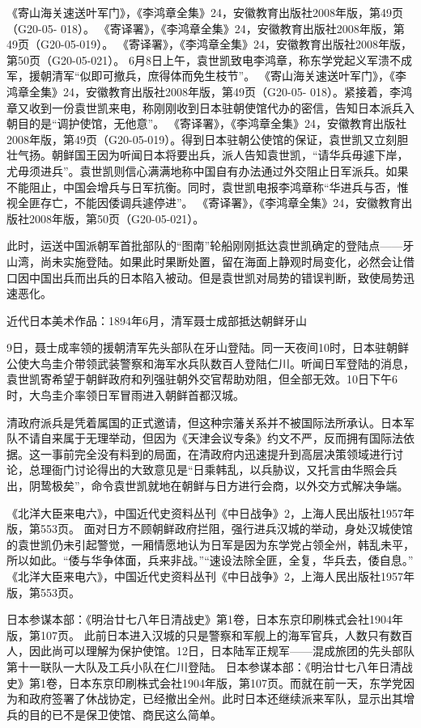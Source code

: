 \documentclass[12pt,UTF8]{ctexbook}
\begin{document}
《寄山海关速送叶军门》，《李鸿章全集》24，安徽教育出版社2008年版，第49页（G20-05- 018）。
《寄译署》，《李鸿章全集》24，安徽教育出版社2008年版，第49页（G20-05-019）。
《寄译署》，《李鸿章全集》24，安徽教育出版社2008年版，第50页（G20-05-021）。
6月8日上午，袁世凯致电李鸿章，称东学党起义军溃不成军，援朝清军“似即可撤兵，庶得体而免生枝节”。 《寄山海关速送叶军门》，《李鸿章全集》24，安徽教育出版社2008年版，第49页（G20-05- 018）。紧接着，李鸿章又收到一份袁世凯来电，称刚刚收到日本驻朝使馆代办的密信，告知日本派兵入朝目的是“调护使馆，无他意”。 《寄译署》，《李鸿章全集》24，安徽教育出版社2008年版，第49页（G20-05-019）。得到日本驻朝公使馆的保证，袁世凯又立刻胆壮气扬。朝鲜国王因为听闻日本将要出兵，派人告知袁世凯，“请华兵毋遽下岸，尤毋须进兵”。袁世凯则信心满满地称中国自有办法通过外交阻止日军派兵。如果不能阻止，中国会增兵与日军抗衡。同时，袁世凯电报李鸿章称“华进兵与否，惟视全匪存亡，不能因倭调兵遽停进”。 《寄译署》，《李鸿章全集》24，安徽教育出版社2008年版，第50页（G20-05-021）。

此时，运送中国派朝军首批部队的“图南”轮船刚刚抵达袁世凯确定的登陆点——牙山湾，尚未实施登陆。如果此时果断处置，留在海面上静观时局变化，必然会让借口因中国出兵而出兵的日本陷入被动。但是袁世凯对局势的错误判断，致使局势迅速恶化。


近代日本美术作品：1894年6月，清军聂士成部抵达朝鲜牙山

9日，聂士成率领的援朝清军先头部队在牙山登陆。同一天夜间10时，日本驻朝鲜公使大鸟圭介带领武装警察和海军水兵队数百人登陆仁川。听闻日军登陆的消息，袁世凯寄希望于朝鲜政府和列强驻朝外交官帮助劝阻，但全部无效。10日下午6时，大鸟圭介率领日军冒雨进入朝鲜首都汉城。

清政府派兵是凭着属国的正式邀请，但这种宗藩关系并不被国际法所承认。日本军队不请自来属于无理举动，但因为《天津会议专条》约文不严，反而拥有国际法依据。这一事前完全没有料到的局面，在清政府内迅速提升到高层决策领域进行讨论，总理衙门讨论得出的大致意见是“日乘韩乱，以兵胁议，又托言由华照会兵出，阴鸷极矣”，命令袁世凯就地在朝鲜与日方进行会商，以外交方式解决争端。

《北洋大臣来电六》，中国近代史资料丛刊《中日战争》2，上海人民出版社1957年版，第553页。
面对日方不顾朝鲜政府拦阻，强行进兵汉城的举动，身处汉城使馆的袁世凯仍未引起警觉，一厢情愿地认为日军是因为东学党占领全州，韩乱未平，所以如此。“倭与华争体面，兵来非战。”“速设法除全匪，全复，华兵去，倭自息。” 《北洋大臣来电六》，中国近代史资料丛刊《中日战争》2，上海人民出版社1957年版，第553页。

日本参谋本部：《明治廿七八年日清战史》第1卷，日本东京印刷株式会社1904年版，第107页。
此前日本进入汉城的只是警察和军舰上的海军官兵，人数只有数百人，因此尚可以理解为保护使馆。12日，日本陆军正规军——混成旅团的先头部队第十一联队一大队及工兵小队在仁川登陆。 日本参谋本部：《明治廿七八年日清战史》第1卷，日本东京印刷株式会社1904年版，第107页。而就在前一天，东学党因为和政府签署了休战协定，已经撤出全州。此时日本还继续派来军队，显示出其增兵的目的已不是保卫使馆、商民这么简单。
\end{document}
